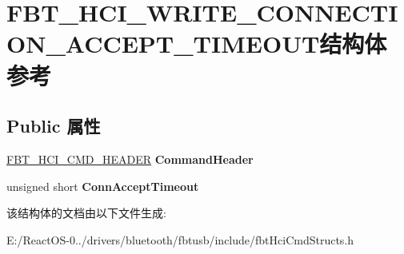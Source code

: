 \hypertarget{struct_f_b_t___h_c_i___w_r_i_t_e___c_o_n_n_e_c_t_i_o_n___a_c_c_e_p_t___t_i_m_e_o_u_t}{}\section{F\+B\+T\+\_\+\+H\+C\+I\+\_\+\+W\+R\+I\+T\+E\+\_\+\+C\+O\+N\+N\+E\+C\+T\+I\+O\+N\+\_\+\+A\+C\+C\+E\+P\+T\+\_\+\+T\+I\+M\+E\+O\+U\+T结构体 参考}
\label{struct_f_b_t___h_c_i___w_r_i_t_e___c_o_n_n_e_c_t_i_o_n___a_c_c_e_p_t___t_i_m_e_o_u_t}
\subsection*{Public 属性}
\begin{DoxyCompactItemize}
\item 
\mbox{\label{struct_f_b_t___h_c_i___w_r_i_t_e___c_o_n_n_e_c_t_i_o_n___a_c_c_e_p_t___t_i_m_e_o_u_t_aa157abc5f868fbcb65cc06021de5f418}} 
\hyperlink{struct_f_b_t___h_c_i___c_m_d___h_e_a_d_e_r}{F\+B\+T\+\_\+\+H\+C\+I\+\_\+\+C\+M\+D\+\_\+\+H\+E\+A\+D\+ER} {\bfseries Command\+Header}
\item 
\mbox{\label{struct_f_b_t___h_c_i___w_r_i_t_e___c_o_n_n_e_c_t_i_o_n___a_c_c_e_p_t___t_i_m_e_o_u_t_a79bb1f45c642d2d4fd3d96f571416547}} 
unsigned short {\bfseries Conn\+Accept\+Timeout}
\end{DoxyCompactItemize}


该结构体的文档由以下文件生成\+:\begin{DoxyCompactItemize}
\item 
E\+:/\+React\+O\+S-\/0../drivers/bluetooth/fbtusb/include/fbt\+Hci\+Cmd\+Structs.\+h\end{DoxyCompactItemize}
